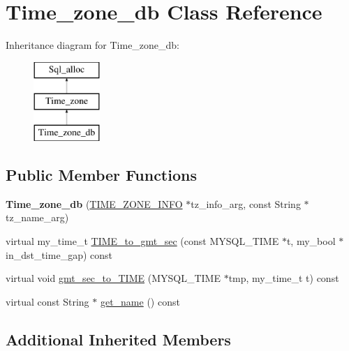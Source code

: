\hypertarget{classTime__zone__db}{}\section{Time\+\_\+zone\+\_\+db Class Reference}
\label{classTime__zone__db}
Inheritance diagram for Time\+\_\+zone\+\_\+db\+:\begin{figure}[H]
\begin{center}
\leavevmode
\includegraphics[height=3.000000cm]{classTime__zone__db}
\end{center}
\end{figure}
\subsection*{Public Member Functions}
\begin{DoxyCompactItemize}
\item 
\mbox{\label{classTime__zone__db_ac5df040a2e7202505d58bc51d0ce1edb}} 
{\bfseries Time\+\_\+zone\+\_\+db} (\mbox{\hyperlink{structst__time__zone__info}{T\+I\+M\+E\+\_\+\+Z\+O\+N\+E\+\_\+\+I\+N\+FO}} $\ast$tz\+\_\+info\+\_\+arg, const String $\ast$tz\+\_\+name\+\_\+arg)
\item 
virtual my\+\_\+time\+\_\+t \mbox{\hyperlink{classTime__zone__db_afcb398ef9a0ddc1bafc5fd80b2ad9ea4}{T\+I\+M\+E\+\_\+to\+\_\+gmt\+\_\+sec}} (const M\+Y\+S\+Q\+L\+\_\+\+T\+I\+ME $\ast$t, my\+\_\+bool $\ast$in\+\_\+dst\+\_\+time\+\_\+gap) const
\item 
virtual void \mbox{\hyperlink{classTime__zone__db_a25ecf69eb2b6802ecd8d7db2166bcecb}{gmt\+\_\+sec\+\_\+to\+\_\+\+T\+I\+ME}} (M\+Y\+S\+Q\+L\+\_\+\+T\+I\+ME $\ast$tmp, my\+\_\+time\+\_\+t t) const
\item 
virtual const String $\ast$ \mbox{\hyperlink{classTime__zone__db_a64a55114c5945e21840cdc4862f4b831}{get\+\_\+name}} () const
\end{DoxyCompactItemize}
\subsection*{Additional Inherited Members}


